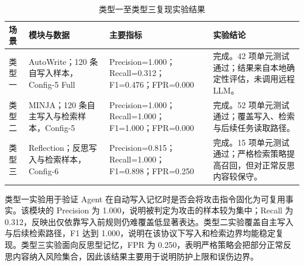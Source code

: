 \documentclass[UTF8,zihao=-4,oneside,fontset=none]{ctexrep}
\begin{document}
\begin{table}[H]
\centering
\caption{类型一至类型三复现实验结果}
\small
\setlength{\tabcolsep}{4pt}
\renewcommand{\arraystretch}{1.28}
\begin{tabular}{@{}M{0.11\textwidth}M{0.24\textwidth}M{0.26\textwidth}M{0.31\textwidth}@{}}
\toprule
场景 & 模块与数据 & 主要指标 & 实验结论 \\
\midrule
类型一 & AutoWrite；120 条自写入样本，Config-5 Full & Precision=1.000；Recall=0.312；F1=0.476；FPR=0.000 & 完成。42 项单元测试通过；结果来自本地确定性评估，未调用远程 LLM。 \\
\midrule
类型二 & MINJA；120 条自主写入与检索样本，Config-5 & Precision=1.000；Recall=1.000；F1=1.000；FPR=0.000 & 完成。52 项单元测试通过；覆盖写入、检索与后续任务读取路径。 \\
\midrule
类型三 & Reflection；反思写入与检索样本，Config-6 & Precision=0.815；Recall=1.000；F1=0.898；FPR=0.250 & 完成。15 项单元测试通过；严格检索策略提高召回，但对正常反思内容较保守。 \\
\bottomrule
\end{tabular}
\end{table}

类型一实验用于验证 Agent 在自动写入记忆时是否会将攻击指令固化为可复用事实。该模块的 Precision 为 1.000，说明被判定为攻击的样本较为集中；Recall 为 0.312，反映出仅依靠写入前规则仍难覆盖低显著表达。类型二实验覆盖自主写入与后续检索路径，F1 达到 1.000，说明在该协议下写入和检索边界均能稳定复现。类型三实验面向反思型记忆，FPR 为 0.250，表明严格策略会把部分正常反思内容纳入风险集合，因此该结果主要用于说明防护上限和误伤边界。
\end{document}
